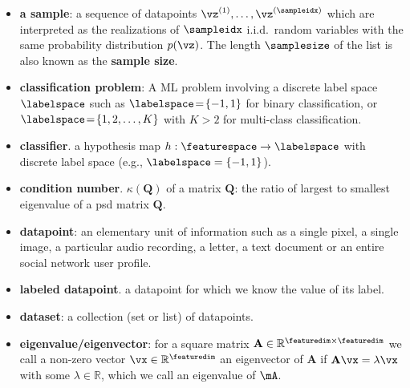 \documentclass[12pt]{report}
\begin{document}
\begin{itemize}
	
	
\item {\bf a sample}: a sequence of datapoints 
$\vz^{(1)},\ldots,\vz^{(\sampleidx)}$ which are 
interpreted as the realizations of $\sampleidx$ 
i.i.d.\ random variables with the same probability 
distribution $p(\vz)$. The length $\samplesize$ 
of the list is also known as the {\bf sample size}.  

\item {\bf classification problem}: A ML problem involving 
a discrete label space $\labelspace$ such as $\labelspace\!=\!\{-1,1\}$ 
for binary classification, or $\labelspace\!=\!\{1,2,\ldots,K\}$ 
with $K\!>\!2$ for multi-class classification. 

\item {\bf classifier}. a hypothesis map $h: \featurespace \rightarrow \labelspace$ 
with discrete label space (e.g., $\labelspace=\{-1,1\}$). 

\item {\bf condition number}. $\kappa(\mathbf{Q})$ of a matrix $\mathbf{Q}$: 
the ratio of largest to smallest eigenvalue of a psd matrix $\mathbf{Q}$.

\item {\bf datapoint}: an elementary unit of information such 
as a single pixel, a single image, a particular audio recording, 
a letter, a text document or an entire social network user profile. 

\item {\bf labeled datapoint}. a datapoint for which we know the 
value of its label. 

\item {\bf dataset}: a collection (set or list) of datapoints. 

\item {\bf eigenvalue/eigenvector}: for a square matrix $\mathbf{A} \in \mathbb{R}^{\featuredim \times \featuredim}$ 
we call a non-zero vector $\vx \in \mathbb{R}^{\featuredim}$ 
an eigenvector of $\mathbf{A}$ if $\mathbf{A} \vx = \lambda \vx$ 
with some $\lambda \in \mathbb{R}$, which we call an eigenvalue 
of $\mA$. 


\end{itemize}
\end{document}
